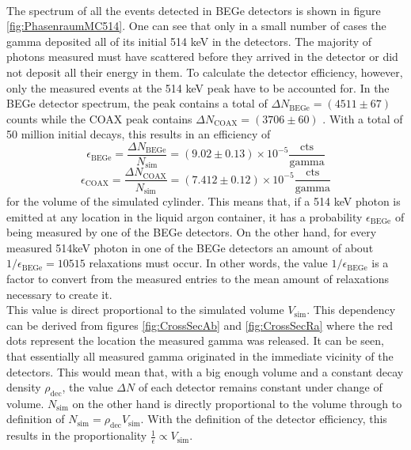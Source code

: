 \documentclass[encoding=utf8,british]{tumphthesis}
\begin{document}
\\
The spectrum of all the events detected in BEGe detectors is shown in figure \ref{fig:PhasenraumMC514}.
One can see that only in a small number of cases the gamma deposited all of its initial 514 keV in the detectors.
The majority of photons measured must have scattered before they arrived in the detector or did not deposit all their energy in them.
To calculate the detector efficiency, however, only the measured events at the 514 keV peak have to be accounted for.
In the BEGe detector spectrum, the peak contains a total of \(\Delta N_{\mathrm{BEGe}} = (4511\pm67)\) counts while the COAX peak contains \(\Delta N_{\mathrm{COAX}} = (3706\pm60)\) .
With a total of 50 million initial decays, this results in an efficiency of 
\begin{equation*}
\epsilon_{\mathrm{BEGe}} = \frac{\Delta N_{\mathrm{BEGe}}}{N_{\mathrm{sim}}} = (9.02\pm0.13) \times 10^{-5}  \frac{\mathrm{cts}}{\mathrm{gamma}}
\end{equation*}
\begin{equation*}
\epsilon_{\mathrm{COAX}} = \frac{\Delta N_{\mathrm{COAX}}}{N_{\mathrm{sim}}} = (7.412\pm0.12) \times 10^{-5}  \frac{\mathrm{cts}}{\mathrm{gamma}}
\end{equation*}
for the volume of the simulated cylinder.
This means that, if a 514 keV photon is emitted at any location in the liquid argon container, it has a probability \(\epsilon_{\mathrm{BEGe}}\) of being measured by one of the BEGe detectors.
On the other hand, for every measured 514keV photon in one of the BEGe detectors an amount of about $1 / \epsilon_{\mathrm{BEGe}} = 10515$  relaxations must occur.
In other words, the value $1 / \epsilon_{\mathrm{BEGe}}$ is a factor to convert from the measured entries to the mean amount of  relaxations necessary to create it.
\\

This value is direct proportional to the simulated volume $V_{\mathrm{sim}}$.
This dependency can be derived from figures \ref{fig:CrossSecAb} and \ref{fig:CrossSecRa} where the red dots represent the location the measured gamma was released.
It can be seen, that essentially all measured gamma originated in the immediate vicinity of the detectors.
This would mean that, with a big enough volume and a constant decay density $\rho_{\mathrm{dec}}$, the value $\Delta N$ of each detector remains constant under change of volume.
$N_{\mathrm{sim}}$ on the other hand is directly proportional to the volume through to definition of $N_{\mathrm{sim}} = \rho_{\mathrm{dec}} V_{\mathrm{sim}}$.
With the definition of the detector efficiency, this results in the proportionality  $\frac{1}{\epsilon} \propto V_{\mathrm{sim}}$.
\\
\end{document}
